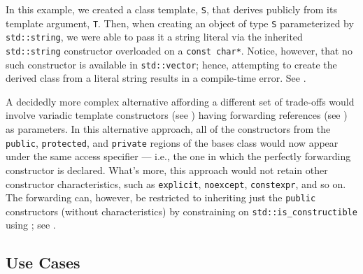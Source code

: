\noindent In this example, we created a class template, \lstinline!S!, that
derives publicly from its template argument, \lstinline!T!. Then, when
creating an object of type \lstinline!S! parameterized by
\lstinline!std::string!, we were able to pass it a string literal via
the inherited \lstinline!std::string! constructor overloaded on a
\lstinline!const!~\lstinline!char*!. Notice, however, that no such constructor
is available in \lstinline!std::vector!; hence, attempting to create the
derived class from a literal string results in a compile-time error. See .

A decidedly more
complex alternative affording a different set of trade-offs would
  involve variadic template constructors (see )
  having
 forwarding references (see )
 as parameters. In this
  alternative approach, all of the constructors from the
  \mbox{\lstinline!public!}, \mbox{\lstinline!protected!}, and \mbox{\lstinline!private!} regions of the
  bases class would now appear under the same access specifier --- i.e.,
  the one in which the perfectly forwarding constructor is declared.
  What's more, this approach would not retain other constructor
  characteristics, such as \lstinline!explicit!, \lstinline!noexcept!,
  \lstinline!constexpr!, and so on. The forwarding can, however, be restricted to
  inheriting just the \lstinline!public! constructors (without
  characteristics) by constraining on \lstinline!std::is_constructible!
  using ; see .

\subsection[Use Cases]{Use Cases}\label{use-cases-ctorinheriting}
\label{abstract-use-case}

